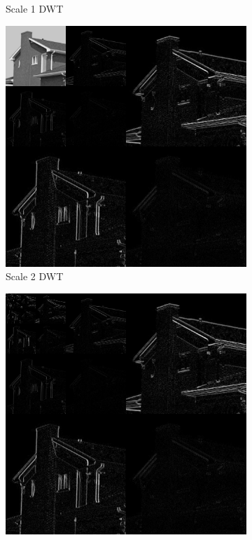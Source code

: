 \begin{figure}
\begin{subfigure}{0.4\textwidth}
  \caption{Scale 1 DWT}
\end{subfigure}
\begin{subfigure}{0.4\textwidth}
  \includegraphics[width=\textwidth]{Chapter3/Images/dwt2.png}
  \caption{Scale 2 DWT}
\end{subfigure}
\begin{subfigure}{0.4\textwidth}
  \includegraphics[width=\textwidth]{Chapter3/Images/dwt9.png}

\end{subfigure}
\end{figure}
